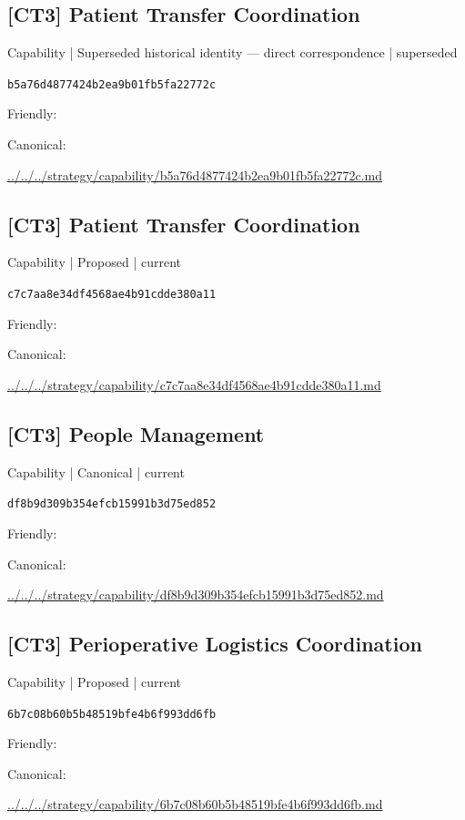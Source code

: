 \documentclass[10pt,a4paper]{article}
\begin{document}
\subsection*{[CT3] Patient Transfer Coordination}
{\small Capability | Superseded historical identity — direct correspondence | superseded}\par
\texttt{b5a76d4877424b2ea9b01fb5fa22772c}\par
Friendly: \par
Canonical: \par
{\footnotesize\url{../../../strategy/capability/b5a76d4877424b2ea9b01fb5fa22772c.md}}\par
\subsection*{[CT3] Patient Transfer Coordination}
{\small Capability | Proposed | current}\par
\texttt{c7c7aa8e34df4568ae4b91cdde380a11}\par
Friendly: \par
Canonical: \par
{\footnotesize\url{../../../strategy/capability/c7c7aa8e34df4568ae4b91cdde380a11.md}}\par
\subsection*{[CT3] People Management}
{\small Capability | Canonical | current}\par
\texttt{df8b9d309b354efcb15991b3d75ed852}\par
Friendly: \par
Canonical: \par
{\footnotesize\url{../../../strategy/capability/df8b9d309b354efcb15991b3d75ed852.md}}\par
\subsection*{[CT3] Perioperative Logistics Coordination}
{\small Capability | Proposed | current}\par
\texttt{6b7c08b60b5b48519bfe4b6f993dd6fb}\par
Friendly: \par
Canonical: \par
{\footnotesize\url{../../../strategy/capability/6b7c08b60b5b48519bfe4b6f993dd6fb.md}}\par
\end{document}
